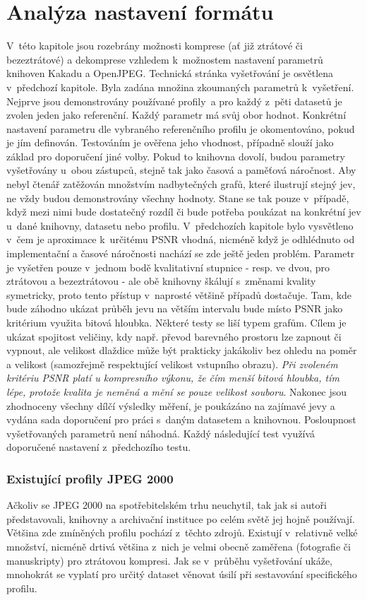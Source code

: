 \chapter{Analýza nastavení formátu}
\label{analyza}
V~této kapitole jsou rozebrány možnosti komprese (ať již ztrátové či bezeztrátové) a dekomprese vzhledem k~možnostem nastavení parametrů knihoven Kakadu a OpenJPEG. Technická stránka vyšetřování je osvětlena v~předchozí kapitole. Byla zadána množina zkoumaných parametrů k~vyšetření. Nejprve jsou demonstrovány používané profily~a pro každý z~pěti datasetů je zvolen jeden jako referenční. Každý parametr má svůj obor hodnot. Konkrétní nastavení parametru dle vybraného referenčního profilu je okomentováno, pokud je jím definován. Testováním je ověřena jeho vhodnost, případně slouží jako základ pro doporučení jiné volby. Pokud to knihovna dovolí, budou parametry vyšetřovány u~obou zástupců, stejně tak jako časová a paměťová náročnost. Aby nebyl čtenář zatěžován množstvím nadbytečných grafů, které ilustrují stejný jev, ne vždy budou demonstrovány všechny hodnoty. Stane se tak pouze v~případě, když mezi nimi bude dostatečný rozdíl či bude potřeba poukázat na konkrétní jev u~dané knihovny, datasetu nebo profilu.  
V~předchozích kapitole bylo vysvětleno v~čem je aproximace k~určitému PSNR vhodná, nicméně když je odhlédnuto od implementační a časové náročnosti nachází se zde ještě jeden problém. Parametr je vyšetřen pouze v~jednom bodě kvalitativní stupnice - resp. ve dvou, pro ztrátovou a bezeztrátovou - ale obě knihovny škálují s~změnami kvality symetricky, proto tento přístup v~naprosté většině případů dostačuje. Tam, kde bude záhodno ukázat průběh jevu na větším intervalu bude místo PSNR jako kritérium využita bitová hloubka. Některé testy se liší typem grafům. Cílem je ukázat spojitost veličiny, kdy např. převod barevného prostoru lze zapnout či vypnout, ale velikost dlaždice může být prakticky jakákoliv bez ohledu na poměr a velikost (samozřejmě respektující velikost vstupního obrazu). \textit{Při zvoleném kritériu PSNR platí u kompresního výkonu, že čím menší bitová hloubka, tím lépe, protože kvalita je neměná a mění se pouze velikost souboru}.  Nakonec jsou zhodnoceny všechny dílčí výsledky měření, je poukázáno na zajímavé jevy a vydána sada doporučení pro práci s~daným datasetem a knihovnou. Posloupnost vyšetřovaných parametrů není náhodná. Každý následující test využívá doporučené nastavení z~předchozího testu.

\newpage
\subsection*{Existující profily JPEG 2000}
Ačkoliv se JPEG 2000 na spotřebitelském trhu neuchytil, tak jak si autoři představovali, knihovny a archivační instituce po celém světě jej hojně používají. Většina zde zmíněných profilu pochází z~těchto zdrojů. Existují v~relativně velké množství, nicméně drtivá většina z~nich je velmi obecně zaměřena (fotografie či manuskripty) pro ztrátovou kompresi.  Jak se v~průběhu vyšetřování ukáže, mnohokrát se vyplatí pro určitý dataset věnovat úsilí při sestavování specifického profilu.\\

